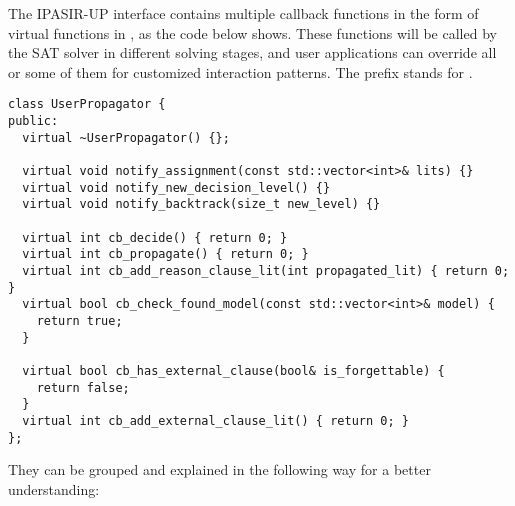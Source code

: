 The IPASIR-UP interface contains multiple callback functions in the form of virtual functions in , as the code below shows. These functions will be called by the SAT solver in different solving stages, and user applications can override all or some of them for customized interaction patterns. The  prefix stands for .

\begin{lstlisting}
class UserPropagator {
public:
  virtual ~UserPropagator() {};

  virtual void notify_assignment(const std::vector<int>& lits) {}
  virtual void notify_new_decision_level() {}
  virtual void notify_backtrack(size_t new_level) {}

  virtual int cb_decide() { return 0; }
  virtual int cb_propagate() { return 0; }
  virtual int cb_add_reason_clause_lit(int propagated_lit) { return 0; }
  virtual bool cb_check_found_model(const std::vector<int>& model) {
    return true;
  }

  virtual bool cb_has_external_clause(bool& is_forgettable) {
    return false;
  }
  virtual int cb_add_external_clause_lit() { return 0; }
};
\end{lstlisting}

They can be grouped and explained in the following way for a better understanding:

